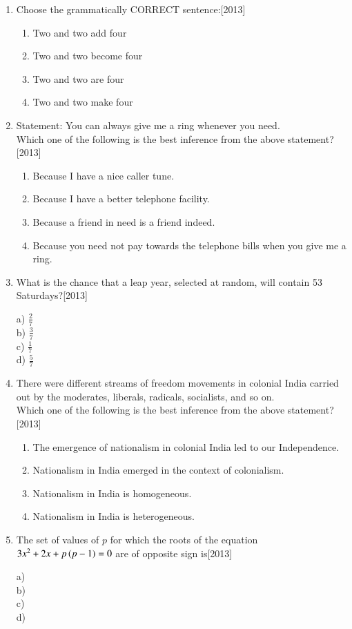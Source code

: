 \documentclass[journal]{IEEEtran}
\begin{document}
\begin{enumerate}[start=53]
\item Choose the grammatically CORRECT sentence:\hfill{[2013]}
\begin{enumerate}
    \item Two and two add four
    \item Two and two become four
    \item Two and two are four
    \item Two and two make four
\end{enumerate}
\item Statement: You can always give me a ring whenever you need.\\
Which one of the following is the best inference from the above statement?\hfill{[2013]}
\begin{enumerate}
    \item Because I have a nice caller tune.
    \item Because I have a better telephone facility.
    \item Because a friend in need is a friend indeed.
    \item Because you need not pay towards the telephone bills when you give me a ring.
\end{enumerate}

\item What is the chance that a leap year, selected at random, will contain 53 Saturdays?\hfill{[2013]}
\begin{multicols}{4}
     a) $\frac{2}{7}$\\
     b) $\frac{3}{7}$\\
     c) $\frac{1}{7}$\\
     d) $\frac{5}{7}$
 \end{multicols}

\item There were different streams of freedom movements in colonial India carried out by the moderates, liberals, radicals, socialists, and so on.\\
Which one of the following is the best inference from the above statement?\hfill{[2013]}
\begin{enumerate}
    \item The emergence of nationalism in colonial India led to our Independence.
    \item Nationalism in India emerged in the context of colonialism.
    \item Nationalism in India is homogeneous.
    \item Nationalism in India is heterogeneous.
\end{enumerate}
\item The set of values of $p$ for which the roots of the equation $3x^2+2x+p\left(p-1\right)=0$ are of opposite sign is\hfill{[2013]}
\begin{multicols}{4}
     a) \\
     b) \\
     c) \\
     d) 
 \end{multicols}


\end{enumerate}
\end{document}
